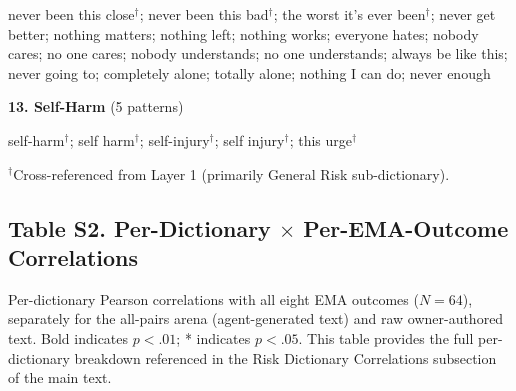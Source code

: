 \documentclass[review,12pt,authoryear]{elsarticle}
\begin{document}
\noindent\small never been this close$^\dagger$; never been this bad$^\dagger$; the worst it's ever been$^\dagger$; never get better; nothing matters; nothing left; nothing works; everyone hates; nobody cares; no one cares; nobody understands; no one understands; always be like this; never going to; completely alone; totally alone; nothing I can do; never enough

\bigskip

\noindent\normalsize\textbf{13. Self-Harm} (5 patterns)

\noindent\small self-harm$^\dagger$; self harm$^\dagger$; self-injury$^\dagger$; self injury$^\dagger$; this urge$^\dagger$

\bigskip

\noindent\normalsize $^\dagger$Cross-referenced from Layer 1 (primarily General Risk sub-dictionary).

\clearpage
\subsection*{Table S2. Per-Dictionary $\times$ Per-EMA-Outcome Correlations}

Per-dictionary Pearson correlations with all eight EMA outcomes ($N = 64$), separately for the all-pairs arena (agent-generated text) and raw owner-authored text. Bold indicates $p < .01$; * indicates $p < .05$. This table provides the full per-dictionary breakdown referenced in the Risk Dictionary Correlations subsection of the main text.

\bigskip
\end{document}

